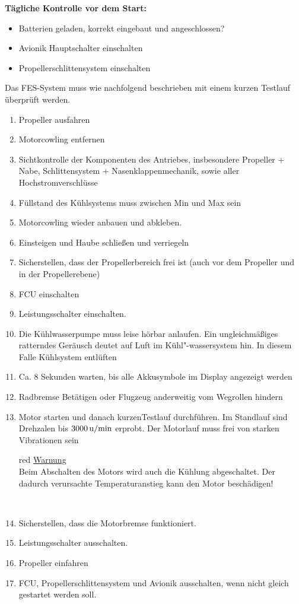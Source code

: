 \textbf{Tägliche Kontrolle vor dem Start: \\}
\begin{itemize}
\item Batterien geladen, korrekt eingebaut und angeschlossen?
\item Avionik Hauptschalter einschalten
\item Propellerschlittensystem einschalten
\end{itemize}

Das FES-System muss wie nachfolgend beschrieben mit einem kurzen Testlauf überprüft werden.\\

\begin{enumerate}

\item Propeller ausfahren
\item	Motorcowling entfernen
\item	Sichtkontrolle der Komponenten des Antriebes, insbesondere Propeller + Nabe, Schlittensystem + Nasenklappenmechanik, sowie aller Hochstromverschlüsse
\item	 Füllstand des Kühlsystems muss zwischen Min und Max sein
\item	 Motorcowling wieder anbauen und abkleben.
\item	Einsteigen und Haube schließen und verriegeln
\item	 Sicherstellen, dass der Propellerbereich frei ist (auch vor dem Propeller und in der Propellerebene)
\item	FCU einschalten
\item	Leistungsschalter einschalten.
\item	Die Kühlwasserpumpe muss leise hörbar anlaufen. Ein ungleichmäßiges ratterndes Geräusch deutet auf Luft im Kühl"-wassersystem hin. In diesem Falle Kühlsystem entlüften
\item	Ca. 8 Sekunden warten, bis alle Akkusymbole im Display angezeigt werden
\item	Radbremse Betätigen oder Flugzeug anderweitig vom Wegrollen hindern
\item	 Motor starten und danach kurzenTestlauf durchführen. Im Standlauf sind Drehzalen bis $\unit[3000]{u/min}$ erprobt. Der Motorlauf muss frei von starken Vibrationen sein

\begin{color}{red}
\large{\underline{Warnung}}\\
Beim Abschalten des Motors wird auch die Kühlung abgeschaltet. Der dadurch verursachte Temperaturanstieg kann den Motor beschädigen!
\end{color}\\

\item	Sicherstellen, dass die Motorbremse funktioniert.
\item	Leistungsschalter ausschalten.
\item	Propeller einfahren
\item	FCU, Propellerschlittensystem und Avionik ausschalten, wenn nicht gleich gestartet werden soll.
\end{enumerate}


